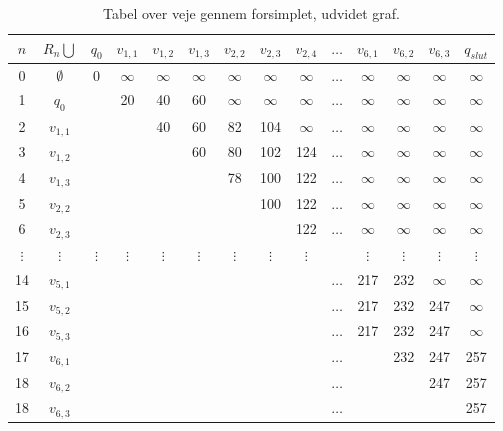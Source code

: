 \begin{table}[H]
\centering
\begin{tabular}{|c|c|c|c|c|c|c|c|c|c|c|c|c|c|} 
\hline
$n$ & $R_{n} \bigcup$ & $q_{0}$ & $v_{1,1}$ & $v_{1,2}$ & $v_{1,3}$ & $v_{2,2}$ & $v_{2,3}$ & $v_{2,4}$ & $\ldots$ & $v_{6,1}$ & $v_{6,2}$ & $v_{6,3}$ & $q_{slut}$ \\
\hline
0 & $\emptyset$ & 0 & $\infty$ & $\infty$ & $\infty$ & $\infty$ & $\infty$ & $\infty$ & $\ldots$ & $\infty$ & $\infty$ & $\infty$ & $\infty$ \\ 
1 & $q_{0}$ & & 20 & 40 & 60 & $\infty$ & $\infty$ & $\infty$ & $\ldots$ & $\infty$ & $\infty$ & $\infty$ & $\infty$\\ 
2 & $v_{1,1}$ & & & 40 & 60 & 82 & 104 & $\infty$ & $\ldots$ & $\infty$ & $\infty$ & $\infty$ & $\infty$\\ 
3 & $v_{1,2}$ & & & & 60 & 80 & 102 & 124 & $\ldots$ & $\infty$ & $\infty$ & $\infty$ & $\infty$\\
4 & $v_{1,3}$ & & & & & 78 & 100 & 122 & $\ldots$ & $\infty$ & $\infty$ & $\infty$ & $\infty$\\ 
5 & $v_{2,2}$ & & & & & & 100 & 122 & $\ldots$ & $\infty$ & $\infty$ & $\infty$ & $\infty$\\ 
6 & $v_{2,3}$ & & & & & & & 122 & $\ldots$ & $\infty$ & $\infty$ & $\infty$ & $\infty$\\  
$\vdots$ & $\vdots$ & $\vdots$ & $\vdots$ & $\vdots$ & $\vdots$ & $\vdots$ & $\vdots$ & $\vdots$ &  & $\vdots$ & $\vdots$ & $\vdots$ & $\vdots$\\ 
14 & $v_{5,1}$ &  &  &  &  &  &  &  & $\ldots$ & 217 & 232 & $\infty$ & $\infty$\\ 
15 & $v_{5,2}$ &  &  &  &  &  &  &  & $\ldots$ & 217 & 232 & 247 & $\infty$\\ 
16 & $v_{5,3}$ &  &  &  &  &  &  &  & $\ldots$ & 217 & 232 & 247 & $\infty$\\ 
17 & $v_{6,1}$ &  &  &  &  &  &  &  & $\ldots$ &  & 232 & 247 & 257\\ 
18 & $v_{6,2}$ &  &  &  &  &  &  &  & $\ldots$ &  &  & 247 & 257\\ 
18 & $v_{6,3}$ &  &  &  &  &  &  &  & $\ldots$ &  &  &  & 257\\ 
\hline
\end{tabular}
\caption{Tabel over veje gennem forsimplet, udvidet graf.}
\label{table:forsimplet_udvidet_graf}
\end{table}